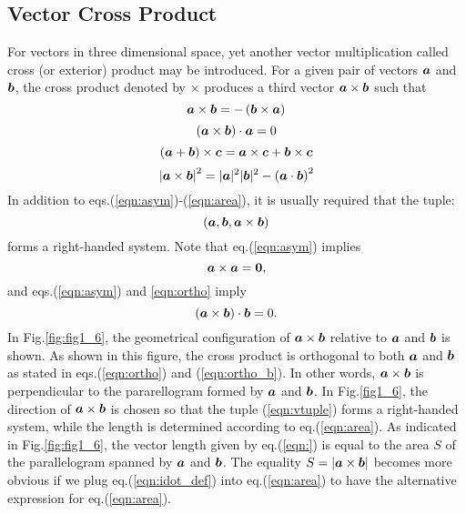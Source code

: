 \documentclass[10pt,a4j]{article}
\begin{document}
\subsection{Vector Cross Product} 
For vectors in three dimensional space, yet another vector multiplication called cross (or exterior) product may be introduced. For a given pair of vectors $\mbox{\boldmath $a$}$ and $\mbox{\boldmath $b$}$, 
the cross product denoted by $\times$ produces a third vector $\mbox{\boldmath $a$}\times \mbox{\boldmath $b$}$ such that 
\begin{equation}
    \mbox{\boldmath $a$}\times \mbox{\boldmath $b$}= -\left(\mbox{\boldmath $b$} \times \mbox{\boldmath $a$} \right)
    \label{eqn:asym}
\end{equation}
\begin{equation}
    \left(\mbox{\boldmath $a$}\times\mbox{\boldmath $b$}\right)\cdot\mbox{\boldmath $a$} = 0
    \label{eqn:ortho}
\end{equation}
\begin{equation}
    \left(\mbox{\boldmath $a$}+\mbox{\boldmath $b$}\right)\times \mbox{\boldmath $c$}
    =
    \mbox{\boldmath $a$}\times \mbox{\boldmath $c$}+ \mbox{\boldmath $b$}\times \mbox{\boldmath $c$}
    \label{eqn:dist_eprod}
\end{equation}
\begin{equation}
    \left|\mbox{\boldmath $a$}\times \mbox{\boldmath $b$} \right|^2=|\mbox{\boldmath $a$}|^2|\mbox{\boldmath $b$}|^2-\left(\mbox{\boldmath $a$}\cdot\mbox{\boldmath $b$}\right)^2
    \label{eqn:area}
\end{equation}
In addition to eqs.(\ref{eqn:asym})-(\ref{eqn:area}), it is usually 
required that the tuple:
\begin{equation}
    \left(\mbox{\boldmath $a$},\mbox{\boldmath $b$},\mbox{\boldmath $a$}\times \mbox{\boldmath $b$} \right)
    \label{eqn:vtuple}
\end{equation}
forms a right-handed system. Note that eq.(\ref{eqn:asym}) implies 
\begin{equation}
    \mbox{\boldmath $a$}\times \mbox{\boldmath $a$}=\mbox{\boldmath $0$}, 
    \label{eqn:}
\end{equation}
and eqs.(\ref{eqn:asym}) and \ref{eqn:ortho} imply 
\begin{equation}
    \left(\mbox{\boldmath $a$}\times\mbox{\boldmath $b$}\right)\cdot\mbox{\boldmath $b$} =0. 
    \label{eqn:ortho_b}
\end{equation}
In Fig.\ref{fig:fig1_6}, the geometrical configuration of $\mbox{\boldmath $a$}\times\mbox{\boldmath $b$}$ relative to $\mbox{\boldmath $a$}$ and $\mbox{\boldmath $b$}$ is shown. As shown in this figure, the cross product is orthogonal to both $\mbox{\boldmath $a$}$ and $\mbox{\boldmath $b$}$ as stated in eqs.(\ref{eqn:ortho}) and (\ref{eqn:ortho_b}). In other words, $\mbox{\boldmath $a$}\times \mbox{\boldmath $b$}$ is perpendicular to the pararellogram formed by $\mbox{\boldmath $a$}$ and $\mbox{\boldmath $b$}$. In Fig.\ref{fig1_6}, the direction of $\mbox{\boldmath $a$}\times\mbox{\boldmath $b$}$ is chosen so that the tuple (\ref{eqn:vtuple}) forms a right-handed system, while the length is determined according to eq.(\ref{eqn:area}). As indicated in Fig.\ref{fig:fig1_6}, the vector length given by eq.(\ref{eqn:}) is equal to the area $S$ of the parallelogram spanned by $\mbox{\boldmath $a$}$ and $\mbox{\boldmath $b$}$. The equality $S=|\mbox{\boldmath $a$}\times \mbox{\boldmath $b$}|$ becomes more obvious if we plug eq.(\ref{eqn:idot_def}) into eq.(\ref{eqn:area}) to have the alternative expression for eq.(\ref{eqn:area}). 
\end{document}
